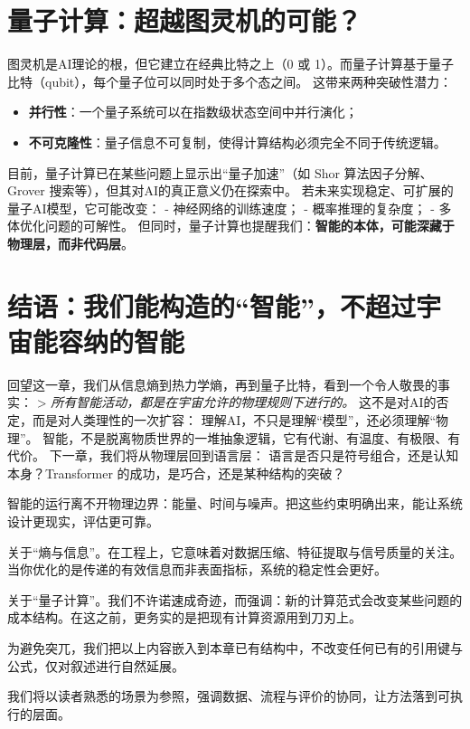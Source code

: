 \section*{量子计算：超越图灵机的可能？}
图灵机是AI理论的根，但它建立在经典比特之上（0 或 1）。而量子计算基于量子比特（qubit），每个量子位可以同时处于多个态之间。
这带来两种突破性潜力：
\begin{itemize}
\item \textbf{并行性}：一个量子系统可以在指数级状态空间中并行演化；
\item \textbf{不可克隆性}：量子信息不可复制，使得计算结构必须完全不同于传统逻辑。
\end{itemize}
目前，量子计算已在某些问题上显示出“量子加速”（如 Shor 算法因子分解、Grover 搜索等），但其对AI的真正意义仍在探索中。
若未来实现稳定、可扩展的量子AI模型，它可能改变：
- 神经网络的训练速度；
- 概率推理的复杂度；
- 多体优化问题的可解性。
但同时，量子计算也提醒我们：\textbf{智能的本体，可能深藏于物理层，而非代码层}。
\section*{结语：我们能构造的“智能”，不超过宇宙能容纳的智能}
回望这一章，我们从信息熵到热力学熵，再到量子比特，看到一个令人敬畏的事实：
> \textit{所有智能活动，都是在宇宙允许的物理规则下进行的。}
这不是对AI的否定，而是对人类理性的一次扩容：
理解AI，不只是理解“模型”，还必须理解“物理”。
智能，不是脱离物质世界的一堆抽象逻辑，它有代谢、有温度、有极限、有代价。
下一章，我们将从物理层回到语言层：
语言是否只是符号组合，还是认知本身？Transformer 的成功，是巧合，还是某种结构的突破？
\nocite{*}
\printbibliography[heading=bibintoc, title=\ebibname]
\newpage


智能的运行离不开物理边界：能量、时间与噪声。把这些约束明确出来，能让系统设计更现实，评估更可靠。

关于“熵与信息”。在工程上，它意味着对数据压缩、特征提取与信号质量的关注。当你优化的是传递的有效信息而非表面指标，系统的稳定性会更好。

关于“量子计算”。我们不许诺速成奇迹，而强调：新的计算范式会改变某些问题的成本结构。在这之前，更务实的是把现有计算资源用到刀刃上。

为避免突兀，我们把以上内容嵌入到本章已有结构中，不改变任何已有的引用键与公式，仅对叙述进行自然延展。

我们将以读者熟悉的场景为参照，强调数据、流程与评价的协同，让方法落到可执行的层面。
